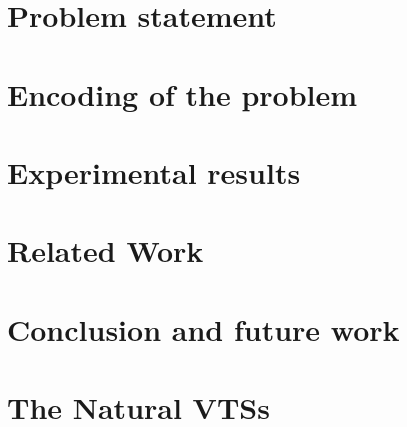 \documentclass[]{llncs}
\begin{document}
\section{Problem statement}
\label{sec:problem}


\section{Encoding of the problem}
\label{sec:encoding}


\section{Experimental results}
\label{sec:experiments}


\section{Related Work}
\label{sec:related}


\section{Conclusion and future work}
\label{sec:conclusion}





\appendix
\clearpage

\section{The Natural VTSs}
\label{sec:ex-vts}

\end{document}
